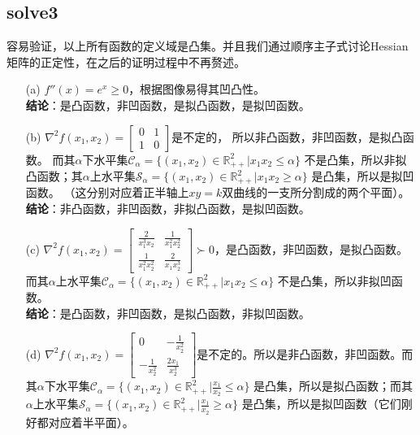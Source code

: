 \documentclass[12pt,a4paper]{ctexart}
\begin{document}
\subsection*{solve3}
容易验证，以上所有函数的定义域是凸集。并且我们通过顺序主子式讨论Hessian矩阵的正定性，在之后的证明过程中不再赘述。
\begin{itemize}
    \item[(a)] $f''(x)=e^x \geq 0$，根据图像易得其凹凸性。\\
    \textbf{结论}：是凸函数，非凹函数，是拟凸函数，是拟凹函数。
    \item[(b)] $\nabla^2f(x_1,x_2)=
    \begin{bmatrix}
        0 & 1 \\
        1 & 0
    \end{bmatrix} 
     $是不定的， 所以非凸函数，非凹函数，是拟凸函数。
    而其$\alpha$下水平集$\mathcal{C}_{\alpha}=\{(x_1,x_2) \in \mathbb{R}^2_{++} | x_1x_2\leq \alpha\}$
    不是凸集，所以非拟凸函数；其$\alpha$上水平集$\mathcal{S}_{\alpha}=\{(x_1,x_2) \in \mathbb{R}^2_{++} | x_1x_2\geq \alpha\}$
    是凸集，所以是拟凹函数。
    （这分别对应着正半轴上$xy=k$双曲线的一支所分割成的两个平面）。\\
    \textbf{结论}：非凸函数，非凹函数，非拟凸函数，是拟凹函数。
    \item[(c)] $\nabla^2f(x_1,x_2)=
    \begin{bmatrix}
        \frac{2}{x_1^3x_2} & \frac{1}{x_1^2x_2^2} \\
        \frac{1}{x_1^2x_2^2} & \frac{2}{x_1x_2^3}
    \end{bmatrix} \succ 0
    $，是凸函数，非凹函数，是拟凸函数。而其$\alpha$上水平集$\mathcal{C}_{\alpha}=\{(x_1,x_2) \in \mathbb{R}^2_{++} | x_1x_2\leq \alpha\}$
    不是凸集，所以非拟凹函数。\\
    \textbf{结论}：是凸函数，非凹函数，是拟凸函数，非拟凹函数。
    \item[(d)] $\nabla^2f(x_1,x_2)=
    \begin{bmatrix}
        0 & -\frac{1}{x_2^2} \\
        -\frac{1}{x_2^2} & \frac{2x_1}{x_2^3}
    \end{bmatrix} 
    $是不定的。所以是非凸函数，非凹函数。而其$\alpha$下水平集$\mathcal{C}_{\alpha}=\{(x_1,x_2) \in \mathbb{R}^2_{++} | \frac{x_1}{x_2}\leq \alpha\}$
    是凸集，所以是拟凸函数；而其$\alpha$上水平集$\mathcal{S}_{\alpha}=\{(x_1,x_2) \in \mathbb{R}^2_{++} | \frac{x_1}{x_2}\geq \alpha\}$
    是凸集，所以是拟凹函数（它们刚好都对应着半平面）。\\

\end{itemize}
\end{document}

